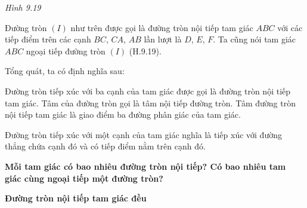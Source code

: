 \begin{lesson}
\begin{enumerate}[label=\alph*)]
        \answerline
        \answerline
    \end{enumerate}

    \begin{center}

    \textit{Hình 9.19}
    \end{center}

    Đường tròn $(I)$ như trên được gọi là đường tròn nội tiếp tam giác $ABC$ với các tiếp điểm trên các cạnh $BC$, $CA$, $AB$ lần lượt là $D$, $E$, $F$. Ta cũng nói tam giác $ABC$ ngoại tiếp đường tròn $(I)$ (H.9.19).

    Tổng quát, ta có định nghĩa sau:

    \begin{keyconcept}
        Đường tròn tiếp xúc với ba cạnh của tam giác được gọi là đường tròn nội tiếp tam giác. Tâm của đường tròn gọi là tâm nội tiếp đường tròn. Tâm đường tròn nội tiếp tam giác là giao điểm ba đường phân giác của tam giác.
    \end{keyconcept}

    Đường tròn tiếp xúc với một cạnh của tam giác nghĩa là tiếp xúc với đường thẳng chứa cạnh đó và có tiếp điểm nằm trên cạnh đó.

    \textbf{Mỗi tam giác có bao nhiêu đường tròn nội tiếp? Có bao nhiêu tam giác cùng ngoại tiếp một đường tròn?}

    \answerline
    \answerline

    \textbf{Đường tròn nội tiếp tam giác đều}


\end{lesson}
